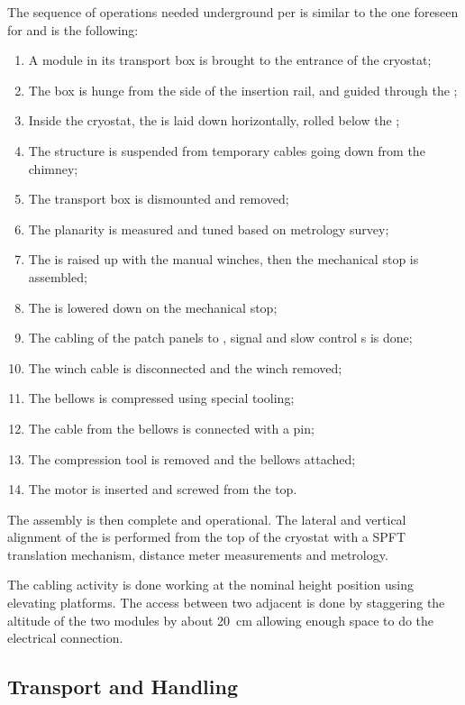 The sequence of operations needed underground per  is similar to the one foreseen for   and is the following: 
\begin{enumerate}
\item A  module in its transport box is brought to the entrance of the cryostat;
\item The box is hunge from the side of the insertion rail, and guided through the ;
\item  Inside the cryostat, the  is laid down horizontally, rolled below the ;
\item The structure is suspended from temporary cables going down from the chimney;
\item The transport box is dismounted and removed;
\item The  planarity is measured and tuned based on metrology survey;
\item The  is raised up with the manual winches, then the mechanical stop is assembled;
\item The  is lowered down  on the mechanical stop;
\item The cabling of the  patch panels to , signal and slow control \fdth{}s is done;
\item The winch cable is disconnected  and the winch removed;
\item The bellows is compressed using special tooling;
\item The cable from the bellows is connected with a pin;
\item The compression tool is removed and the bellows attached;
\item The motor is inserted and screwed from the top.
\end{enumerate}


The assembly is then complete and operational.
The lateral and vertical alignment of the  is performed from the top of the cryostat with a SPFT translation mechanism, distance meter measurements and metrology.

The cabling activity is done  working at the nominal height position using elevating platforms. The access between two adjacent  is done by staggering the altitude of the two modules by about \SI{20}{cm} allowing enough space to do the electrical connection. 


\subsection{Transport and Handling}
\label{sec:fddp-crp-install-transport}

